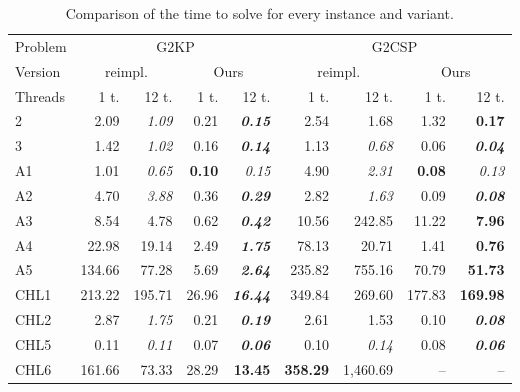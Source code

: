 \documentclass[9pt]{entcs}
\begin{document}
\begin{table}[ht]
\caption{Comparison of the time to solve for every instance and variant.}
\begin{tabular}{@{\extracolsep{4pt}}lrrrrrrrr@{}}
\hline\hline
Problem & \multicolumn{4}{c}{G2KP} & \multicolumn{4}{c}{G2CSP}\\\cline{2-5}\cline{6-9}
Version & \multicolumn{2}{c}{\cite{furini:2016} reimpl.} & \multicolumn{2}{c}{Ours} & \multicolumn{2}{c}{\cite{furini:2016} reimpl.} & \multicolumn{2}{c}{Ours}\\\cline{2-3}\cline{4-5}\cline{6-7}\cline{8-9}
Threads & 1 t. & 12 t. & 1 t. & 12 t. & 1 t. & 12 t. & 1 t. & 12 t. \\\hline
2 & 2.09 & \textit{1.09} & 0.21 & \textbf{\textit{0.15}} & 2.54 & 1.68 & 1.32 & \textbf{0.17} \\
3 & 1.42 & \textit{1.02} & 0.16 & \textbf{\textit{0.14}} & 1.13 & \textit{0.68} & 0.06 & \textbf{\textit{0.04}} \\
A1 & 1.01 & \textit{0.65} & \textbf{0.10} & \textit{0.15} & 4.90 & \textit{2.31} & \textbf{0.08} & \textit{0.13} \\
A2 & 4.70 & \textit{3.88} & 0.36 & \textbf{\textit{0.29}} & 2.82 & \textit{1.63} & 0.09 & \textbf{\textit{0.08}} \\
A3 & 8.54 & 4.78 & 0.62 & \textbf{\textit{0.42}} & 10.56 & 242.85 & 11.22 & \textbf{7.96} \\
A4 & 22.98 & 19.14 & 2.49 & \textbf{\textit{1.75}} & 78.13 & 20.71 & 1.41 & \textbf{0.76} \\
A5 & 134.66 & 77.28 & 5.69 & \textbf{\textit{2.64}} & 235.82 & 755.16 & 70.79 & \textbf{51.73} \\
CHL1 & 213.22 & 195.71 & 26.96 & \textbf{\textit{16.44}} & 349.84 & 269.60 & 177.83 & \textbf{169.98} \\
CHL2 & 2.87 & \textit{1.75} & 0.21 & \textbf{\textit{0.19}} & 2.61 & 1.53 & 0.10 & \textbf{\textit{0.08}} \\
CHL5 & 0.11 & \textit{0.11} & 0.07 & \textbf{\textit{0.06}} & 0.10 & \textit{0.14} & 0.08 & \textbf{\textit{0.06}} \\
CHL6 & 161.66 & 73.33 & 28.29 & \textbf{13.45} & \textbf{358.29} & 1,460.69 & -- & -- \\

\end{tabular}
\end{table}
\end{document}
